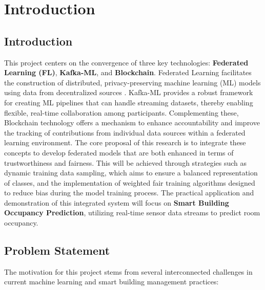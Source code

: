 \chapter{Introduction}

\section{Introduction}
\label{sec:introduction}

This project centers on the convergence of three key technologies: \textbf{Federated Learning (FL)}, \textbf{Kafka-ML}, and \textbf{Blockchain}.
Federated Learning facilitates the construction of distributed, privacy-preserving machine learning (ML) models using data from decentralized sources \cite{mcmahan2017communication,konevcny2016federated}.
Kafka-ML provides a robust framework for creating ML pipelines that can handle streaming datasets, thereby enabling flexible, real-time collaboration among participants.
Complementing these, Blockchain technology offers a mechanism to enhance accountability and improve the tracking of contributions from individual data sources within a federated learning environment.
The core proposal of this research is to integrate these concepts to develop federated models that are both enhanced in terms of trustworthiness and fairness.
This will be achieved through strategies such as dynamic training data sampling, which aims to ensure a balanced representation of classes, and the implementation of weighted fair training algorithms designed to reduce bias during the model training process.
The practical application and demonstration of this integrated system will focus on \textbf{Smart Building Occupancy Prediction}, utilizing real-time sensor data streams to predict room occupancy.
\section{Problem Statement}
\label{sec:problem_statement}

The motivation for this project stems from several interconnected challenges in current machine learning and smart building management practices:

